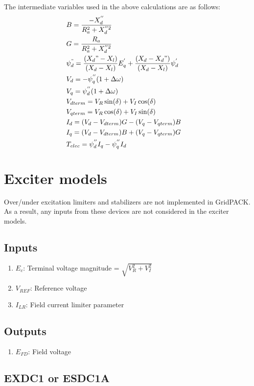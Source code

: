 \documentclass[12pt]{article}
\newcommand{\dw}{\Delta\omega}
\newcommand{\Vref}{V_{REF}}
\begin{document}
The intermediate variables used in the above calculations are as follows:
\begin{align*}
  &B = \dfrac{-X^{''}_d}{R^2_a + X^{''2}_d}&\\
 &G = \dfrac{R_a}{R^2_a+X^{''2}_d}&\\
 &\psi^{"}_{d}=\dfrac{(X_d"-X_l)}{(X_d-X_l)}E^{'}_q+\dfrac{(X_d-X_d")}{(X_d-X_l)}\psi^{'}_d&\\
  &V_d=-\psi^{''}_{q}(1+{\Delta\omega})&\\
  &V_q=\psi^{''}_{d}(1+{\dw})&\\
  &V_{dterm} = V_R\sin({\delta})+V_I\cos({\delta})&\\
  &V_{qterm} = V_R\cos({\delta})+V_I\sin({\delta})&\\
  &I_d = (V_d-V_{dterm})G-(V_q-V_{qterm})B&\\
  &I_q = (V_d-V_{dterm})B+(V_q-V_{qterm})G& \\
   &T_{elec}=\psi^{''}_{d}I_q-\psi^{''}_{q}I_d&
  \end{align*}

\section{Exciter models}
Over/under excitation limiters and stabilizers are not implemented in GridPACK. As a result, any inputs from these devices are not considered in the exciter models.

\subsection{Inputs}
\begin{enumerate}
  \item $E_c$: Terminal voltage magnitude = $\sqrt{V^{2}_R + V^{2}_I}$
  \item $\Vref$: Reference voltage
  \item $I_{LR}$: Field current limiter parameter
\end{enumerate}

\subsection{Outputs}
\begin{enumerate}
  \item $E_{FD}$: Field voltage
\end{enumerate}

\subsection{EXDC1 or ESDC1A \cite{PSSE}}
\end{document}
